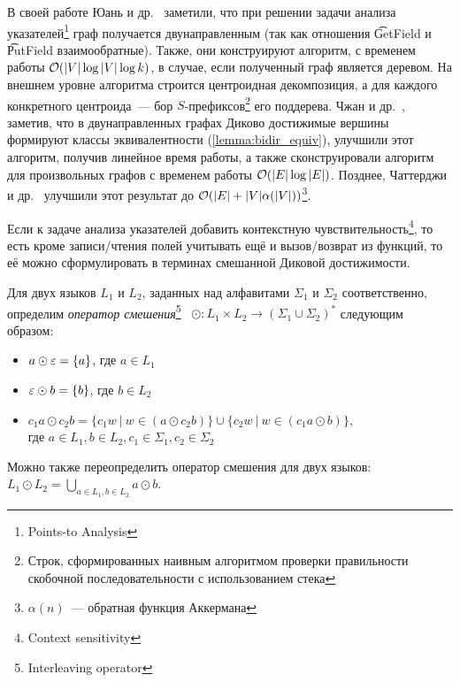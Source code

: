 В своей работе Юань и др.~\cite{Yuan09} заметили, что при решении задачи анализа указателей\footnote{Points-to Analysis} граф получается двунаправленным (так как отношения \t{GetField} и \t{PutField} взаимообратные). Также, они конструируют алгоритм, с временем работы $\mathcal{O}(|V| \log |V| \log k)$, в случае, если полученный граф является деревом. На внешнем уровне алгоритма строится центроидная декомпозиция, а для каждого конкретного центроида~--- бор $S$-префиксов\footnote{Строк, сформированных наивным алгоритмом проверки правильности скобочной последовательности с использованием стека} его поддерева. Чжан и др.~\cite{Zhang13}, заметив, что в двунаправленных графах Диково достижимые вершины формируют классы эквивалентности (\ref{lemma:bidir_equiv}), улучшили этот алгоритм, получив линейное время работы, а также сконструировали алгоритм для произвольных графов с временем работы $\mathcal{O}(|E| \log |E|)$. Позднее, Чаттерджи и др.~\cite{Chatterjee17} улучшили этот результат до $\mathcal{O}(|E| + |V| \alpha(|V|))$\footnote{$\alpha(n)$~--- обратная функция Аккермана}.

Если к задаче анализа указателей добавить контекстную чувствительность\footnote{Context sensitivity}, то есть кроме записи/чтения полей учитывать ещё и вызов/возврат из функций, то её можно сформулировать в терминах смешанной Диковой достижимости.

\begin{definition}
  Для двух языков $L_1$ и $L_2$, заданных над алфавитами $\Sigma_1$ и $\Sigma_2$ соответственно, определим \textit{оператор смешения}\footnote{Interleaving operator}~\cite{Li21} $\odot: L_1 \times L_2 \to (\Sigma_1 \cup \Sigma_2)^{*}$ следующим образом:
  \vspace{-\topsep}
  \begin{itemize}
    \setlength\itemsep{-0.1em}
    \item $a \odot \varepsilon = \{ a \}$, где $a \in L_1$
    \item $\varepsilon \odot b = \{ b \}$, где $b \in L_2$
    \item $c_1 a \odot c_2 b = \{ c_1 w~|~w \in (a \odot c_2 b) \} \cup \{ c_2 w~|~w \in (c_1 a \odot b) \}$,\\ где $a \in L_1, b \in L_2, c_1 \in \Sigma_1, c_2 \in \Sigma_2$
  \end{itemize}

  Можно также переопределить оператор смешения для двух языков:\\ $L_1 \odot L_2 = \bigcup\limits_{a \in L_1, b \in L_2} a \odot b$.
\end{definition}

